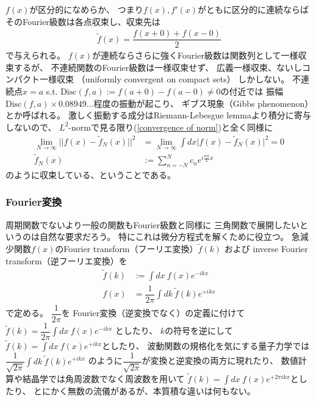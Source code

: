 $f(x)$が区分的になめらか、
つまり$f(x), f'(x)$がともに区分的に連続ならば
そのFourier級数は各点収束し、収束先は
\begin{align}
    \tilde{f}(x) = \dfrac{f(x+0) + f(x-0)}{2}
\end{align}
で与えられる。
$f(x)$が連続ならさらに強くFourier級数は関数列として一様収束するが、
不連続関数のFourier級数は一様収束せず、
広義一様収束、ないしコンパクト一様収束
（uniformly convergent on compact sets）
しかしない。
不連続点$x = a$ s.t.
$\mathrm{Disc}(f,a) := f(a+0) - f(a-0) \neq 0$の付近では
振幅$\mathrm{Disc}(f,a) \times 0.08949\dots$程度の振動が起こり、
ギブス現象（Gibbs phenomenon）とか呼ばれる。
激しく振動する成分はRiemann-Lebesgue lemmaより積分に寄与しないので、
$L^2$-normで見る限り(\ref{convergence of norm})と全く同様に
\begin{subequations}
\begin{align}
    \lim_{N\to\infty}\bigg|\bigg|
        f(x) - \tilde{f}_N(x)
    \bigg|\bigg|^2
    &=
    \lim_{N\to\infty}\int dx
    \Big| f(x) - \tilde{f}_N(x) \Big|^2
    = 0
\\
    \tilde{f}_N(x)
    &:=
    \sum_{n=-N}^N
    c_n e^{ i\frac{n \pi}{L}x }
\end{align}
\end{subequations}
のように収束している、ということである。

\subsubsection{Fourier変換}

周期関数でないより一般の関数もFourier級数と同様に
三角関数で展開したいというのは自然な要求だろう。
特にこれは微分方程式を解くために役立つ。
急減少関数$f(x)$のFourier transform（フーリエ変換）$\tilde{f}(k)$
および
inverse Fourier transform（逆フーリエ変換）を
\begin{subequations}
\begin{align}
    \tilde{f}(k)
    &:=
    \int dx\ f(x) e^{-ikx}
\\
    f(x)
    &=
    \dfrac{1}{2\pi}\int dk\ 
    \tilde{f}(k) e^{+ikx}
\end{align}
\end{subequations}
で定める。
$\dfrac{1}{2\pi}$を
Fourier変換（逆変換でなく）の定義に付けて
$\tilde{f}(k)=\dfrac{1}{2\pi}\int dx\ f(x) e^{-ikx}$
としたり、
$k$の符号を逆にして
$\tilde{f}(k)=\int dx\ f(x) e^{+ikx}$としたり、
波動関数の規格化を気にする量子力学では
$\dfrac{1}{\sqrt{2\pi}}\int dk\ \tilde{f}(k) e^{+ikx}$
のように$\dfrac{1}{\sqrt{2\pi}}$が変換と逆変換の両方に現れたり、
数値計算や結晶学では角周波数でなく周波数を用いて
$\tilde{f}(k)=\int dx\ f(x) e^{+2\pi ikx}$としたり、
とにかく無数の流儀があるが、本質積な違いは何もない。

